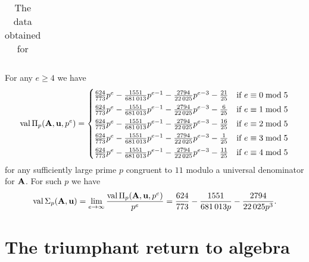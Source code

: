 \documentclass{amsart}
\begin{document}
\begin{example}
\begin{table}
\begin{center}
\begin{tabular}{cccc}
         \end{tabular}
         \endgroup
      \end{center}
      \caption{The data obtained for }
      \label{table: new example data}
   \end{table}
   For any $e\ge 4$ we have
   \[
      \operatorname{val}\Pi_p(\mathbf{A},\mathbf{u},p^e) =
      \begin{cases}
         \frac{624}{773}p^{e} - \frac{\num{1551}}{\num{681013}}p^{e-1} - \frac{\num{2794}}{\num{22025}}p^{e-3} - \frac{21}{25} & \text{if $e \equiv 0 \bmod 5$}\\[1mm]
         \frac{624}{773}p^{e} - \frac{\num{1551}}{\num{681013}}p^{e-1} - \frac{\num{2794}}{\num{22025}}p^{e-3} - \frac{6}{25} & \text{if $e \equiv 1 \bmod 5$}\\[1mm]
         \frac{624}{773}p^{e} - \frac{\num{1551}}{\num{681013}}p^{e-1} - \frac{\num{2794}}{\num{22025}}p^{e-3} - \frac{16}{25} & \text{if $e \equiv 2 \bmod 5$}\\[1mm]
         \frac{624}{773}p^{e} - \frac{\num{1551}}{\num{681013}}p^{e-1} - \frac{\num{2794}}{\num{22025}}p^{e-3} - \frac{1}{25} & \text{if $e \equiv 3 \bmod 5$}\\[1mm]
         \frac{624}{773}p^{e} - \frac{\num{1551}}{\num{681013}}p^{e-1} - \frac{\num{2794}}{\num{22025}}p^{e-3} - \frac{11}{25} & \text{if $e \equiv 4 \bmod 5$}
      \end{cases}
   \]
   for any sufficiently large prime $p$ congruent to $11$ modulo a universal denominator for $\mathbf{A}$.
   For such $p$ we have
   \[\operatorname{val} \Sigma_p(\mathbf{A},\mathbf{u}) = \lim_{e\to \infty}  \frac{\operatorname{val}\Pi_p(\mathbf{A},\mathbf{u},p^e)}{p^e}  = \frac{624}{773} - \frac{\num{1551}}{\num{681013} p} - \frac{\num{2794}}{\num{22025} p^3}.\]
\end{example}




\newpage

\section{The triumphant return to algebra}
\label{frobenius-powers-monomial-ideals: S}
\end{document}
